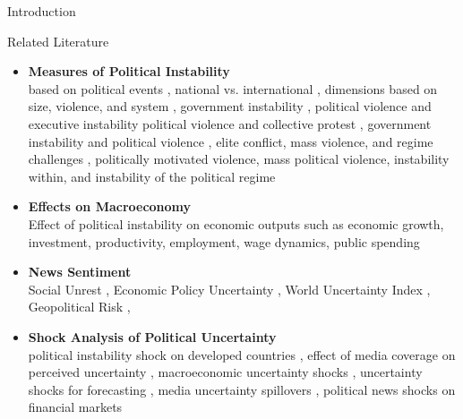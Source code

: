 \documentclass[aspectratio=169,10pt]{beamer}
\begin{document}
\begin{section}[Introduction]{Introduction}
\begin{frame}{Related Literature}\label{literature_PI}
\footnotesize
    \begin{itemize}
            \item \textbf{Measures of Political Instability}\\
            based on political events \citep{Feierabend1966}, national vs. international \citep{Rummel1966}, dimensions based on size, violence, and system \citep{Tanter1966}, government instability \citep{Alesina1996}, political violence and executive instability \citep{Perotti1996}
        political violence and collective protest \citep{HIBBS1973}, government instability and political violence \citep{CAMPOS2002}, elite conflict, mass violence, and regime challenges \citep{Morrison1971}, politically motivated violence, mass political violence, instability within, and instability of the political regime \citep{JONGAPIN2009}

            \item \textbf{Effects on Macroeconomy}\\
            Effect of political instability on economic outputs such as economic growth, investment, productivity, employment, wage dynamics, public spending \citep{VERDUGO2013,Alesina1996,aisen2013,collier2002,CHEN1996,DARBY2004}
            

            
        \item \textbf{News Sentiment} \\
            Social Unrest \citep{BARRETT2022}, Economic Policy Uncertainty \citep{BAKER2016,JIRASAVETAKUL2018}, World Uncertainty Index \citep{AHIR2022}, Geopolitical Risk \citep{CALDARA2022}, %
            
        \item \textbf{Shock Analysis of Political Uncertainty}\\
        political instability shock on developed countries \citep{DIRKS2024102586}, effect of media coverage on perceived uncertainty \citep{shapiro2022}, macroeconomic uncertainty shocks \citep{ahir2023financial}, uncertainty shocks for forecasting \citep{APRIGLIANO2023791}, media uncertainty spillovers \citep{fraiberger2021media}, political news shocks on financial markets \citep{HUANG2019}
    \end{itemize}
\end{frame}



\end{section}
\end{document}
